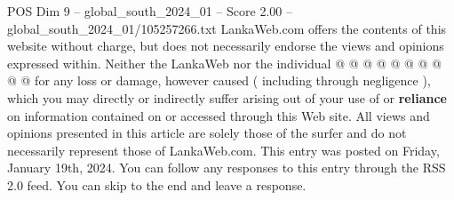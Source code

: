 \begin{textsample}{POS Dim 9 – global\_south\_2024\_01 – Score 2.00 – global\_south\_2024\_01/105257266.txt}
LankaWeb.com offers the contents of this website without charge, but does not necessarily endorse the views and opinions expressed within.
Neither the LankaWeb nor the individual @ @ @ @ @ @ @ @ @ @ for any loss or damage, however caused ( including through negligence ), which you may directly or indirectly suffer arising out of your use of or \textbf{reliance} on information contained on or accessed through this Web site.
All views and opinions presented in this article are solely those of the surfer and do not necessarily represent those of LankaWeb.com.
This entry was posted on Friday, January 19th, 2024.
You can follow any responses to this entry through the RSS 2.0 feed.
You can skip to the end and leave a response.

\end{textsample}
